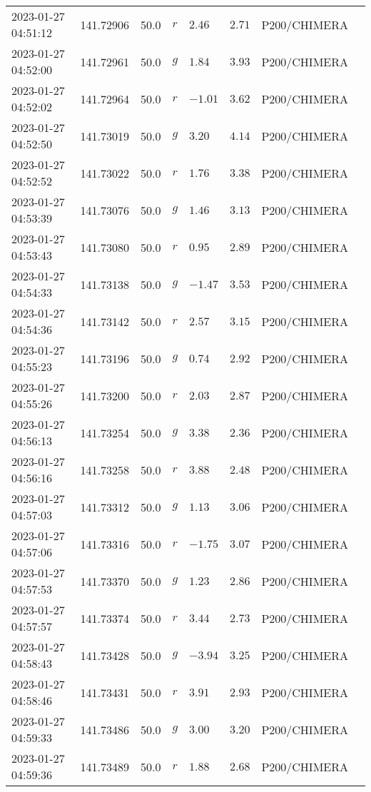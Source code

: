 \documentclass{nature_plusfigure}
\begin{document}
\begin{supplement}
\begin{center}
\begin{longtable}{llllllll}
2023-01-27 04:51:12 & 141.72906 & 50.0 & $r$ & $2.46$ & $2.71$ & P200/CHIMERA &  \\ 
2023-01-27 04:52:00 & 141.72961 & 50.0 & $g$ & $1.84$ & $3.93$ & P200/CHIMERA &  \\ 
2023-01-27 04:52:02 & 141.72964 & 50.0 & $r$ & $-1.01$ & $3.62$ & P200/CHIMERA &  \\ 
2023-01-27 04:52:50 & 141.73019 & 50.0 & $g$ & $3.20$ & $4.14$ & P200/CHIMERA &  \\ 
2023-01-27 04:52:52 & 141.73022 & 50.0 & $r$ & $1.76$ & $3.38$ & P200/CHIMERA &  \\ 
2023-01-27 04:53:39 & 141.73076 & 50.0 & $g$ & $1.46$ & $3.13$ & P200/CHIMERA &  \\ 
2023-01-27 04:53:43 & 141.73080 & 50.0 & $r$ & $0.95$ & $2.89$ & P200/CHIMERA &  \\ 
2023-01-27 04:54:33 & 141.73138 & 50.0 & $g$ & $-1.47$ & $3.53$ & P200/CHIMERA &  \\ 
2023-01-27 04:54:36 & 141.73142 & 50.0 & $r$ & $2.57$ & $3.15$ & P200/CHIMERA &  \\ 
2023-01-27 04:55:23 & 141.73196 & 50.0 & $g$ & $0.74$ & $2.92$ & P200/CHIMERA &  \\ 
2023-01-27 04:55:26 & 141.73200 & 50.0 & $r$ & $2.03$ & $2.87$ & P200/CHIMERA &  \\ 
2023-01-27 04:56:13 & 141.73254 & 50.0 & $g$ & $3.38$ & $2.36$ & P200/CHIMERA &  \\ 
2023-01-27 04:56:16 & 141.73258 & 50.0 & $r$ & $3.88$ & $2.48$ & P200/CHIMERA &  \\ 
2023-01-27 04:57:03 & 141.73312 & 50.0 & $g$ & $1.13$ & $3.06$ & P200/CHIMERA &  \\ 
2023-01-27 04:57:06 & 141.73316 & 50.0 & $r$ & $-1.75$ & $3.07$ & P200/CHIMERA &  \\ 
2023-01-27 04:57:53 & 141.73370 & 50.0 & $g$ & $1.23$ & $2.86$ & P200/CHIMERA &  \\ 
2023-01-27 04:57:57 & 141.73374 & 50.0 & $r$ & $3.44$ & $2.73$ & P200/CHIMERA &  \\ 
2023-01-27 04:58:43 & 141.73428 & 50.0 & $g$ & $-3.94$ & $3.25$ & P200/CHIMERA &  \\ 
2023-01-27 04:58:46 & 141.73431 & 50.0 & $r$ & $3.91$ & $2.93$ & P200/CHIMERA &  \\ 
2023-01-27 04:59:33 & 141.73486 & 50.0 & $g$ & $3.00$ & $3.20$ & P200/CHIMERA &  \\ 
2023-01-27 04:59:36 & 141.73489 & 50.0 & $r$ & $1.88$ & $2.68$ & P200/CHIMERA &  \\ 

\end{longtable}
\end{center}
\end{supplement}
\end{document}
